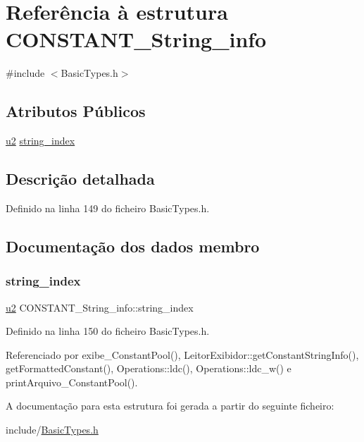 \hypertarget{structCONSTANT__String__info}{}\section{Referência à estrutura C\+O\+N\+S\+T\+A\+N\+T\+\_\+\+String\+\_\+info}
\label{structCONSTANT__String__info}


{\ttfamily \#include $<$Basic\+Types.\+h$>$}

\subsection*{Atributos Públicos}
\begin{DoxyCompactItemize}
\item 
\hyperlink{BasicTypes_8h_a732cde1300aafb73b0ea6c2558a7a54f}{u2} \hyperlink{structCONSTANT__String__info_a3af668a8c82825626fbf4161636e4155}{string\+\_\+index}
\end{DoxyCompactItemize}


\subsection{Descrição detalhada}


Definido na linha 149 do ficheiro Basic\+Types.\+h.



\subsection{Documentação dos dados membro}
\mbox{\label{structCONSTANT__String__info_a3af668a8c82825626fbf4161636e4155}} 
\subsubsection{\texorpdfstring{string\+\_\+index}{string\_index}}
{\footnotesize\ttfamily \hyperlink{BasicTypes_8h_a732cde1300aafb73b0ea6c2558a7a54f}{u2} C\+O\+N\+S\+T\+A\+N\+T\+\_\+\+String\+\_\+info\+::string\+\_\+index}



Definido na linha 150 do ficheiro Basic\+Types.\+h.



Referenciado por exibe\+\_\+\+Constant\+Pool(), Leitor\+Exibidor\+::get\+Constant\+String\+Info(), get\+Formatted\+Constant(), Operations\+::ldc(), Operations\+::ldc\+\_\+w() e print\+Arquivo\+\_\+\+Constant\+Pool().



A documentação para esta estrutura foi gerada a partir do seguinte ficheiro\+:\begin{DoxyCompactItemize}
\item 
include/\hyperlink{BasicTypes_8h}{Basic\+Types.\+h}\end{DoxyCompactItemize}
